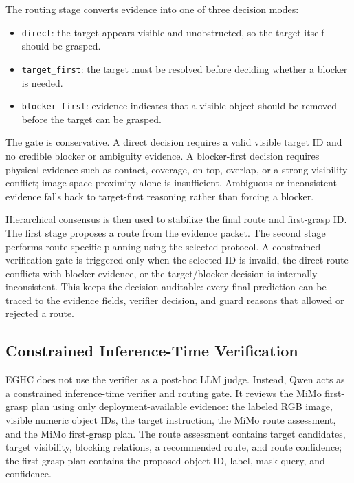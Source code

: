 The routing stage converts evidence into one of three decision modes:
\begin{itemize}
    \item \texttt{direct}: the target appears visible and unobstructed, so the target itself should be grasped.
    \item \texttt{target\_first}: the target must be resolved before deciding whether a blocker is needed.
    \item \texttt{blocker\_first}: evidence indicates that a visible object should be removed before the target can be grasped.
\end{itemize}

The gate is conservative. A direct decision requires a valid visible target ID and no credible blocker or ambiguity evidence. A blocker-first decision requires physical evidence such as contact, coverage, on-top, overlap, or a strong visibility conflict; image-space proximity alone is insufficient. Ambiguous or inconsistent evidence falls back to target-first reasoning rather than forcing a blocker.

Hierarchical consensus is then used to stabilize the final route and first-grasp ID. The first stage proposes a route from the evidence packet. The second stage performs route-specific planning using the selected protocol. A constrained verification gate is triggered only when the selected ID is invalid, the direct route conflicts with blocker evidence, or the target/blocker decision is internally inconsistent. This keeps the decision auditable: every final prediction can be traced to the evidence fields, verifier decision, and guard reasons that allowed or rejected a route.

\subsection{Constrained Inference-Time Verification}

EGHC does not use the verifier as a post-hoc LLM judge. Instead, Qwen acts as a constrained inference-time verifier and routing gate. It reviews the MiMo first-grasp plan using only deployment-available evidence: the labeled RGB image, visible numeric object IDs, the target instruction, the MiMo route assessment, and the MiMo first-grasp plan. The route assessment contains target candidates, target visibility, blocking relations, a recommended route, and route confidence; the first-grasp plan contains the proposed object ID, label, mask query, and confidence.

